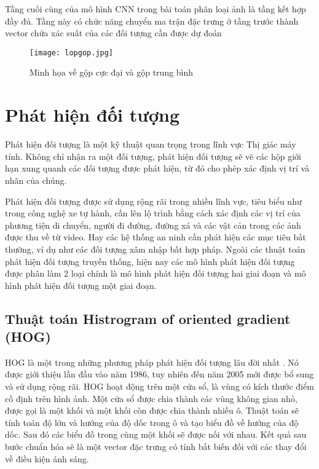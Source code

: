 \documentclass[../the.tex]{subfiles}
\begin{document}
\bigskip

{\fontsize{13}{12} \selectfont

	Tầng cuối cùng của mô hình CNN trong bài toán phân loại ảnh là tầng kết hợp đầy đủ. Tầng này có chức năng chuyển ma trận đặc trưng ở tầng trước thành vector chứa xác suất của các đối tượng cần được dự đoán

}
\begin{figure}[H]
	\centering
	\texttt{[image: lopgop.jpg]}
	\caption{Minh họa về gộp cực đại và gộp trung bình}
	\label{fig:polling}
\end{figure}
\section{Phát hiện đối tượng}
 {\fontsize{13}{12} \selectfont

  Phát hiện đối tượng là một kỹ thuật quan trọng trong lĩnh vực Thị giác máy tính. Không chỉ nhận ra một đối tượng,
  phát hiện đối tượng sẽ vẽ các hộp giới hạn xung quanh các đối tượng được phát hiện, từ đó
  cho phép xác định vị trí và nhãn của chúng.

 }

\bigskip

{\fontsize{13}{12} \selectfont

	Phát hiện đối tượng được sử dụng rộng rãi trong nhiều lĩnh vực, tiêu biểu như trong công nghệ xe tự hành,
	cần lên lộ trình bằng cách xác định các vị trí của phương tiện di chuyển, người đi đường, đường xá và các vật cản trong các ảnh được thu về từ video. Hay các hệ thống an ninh cần phát hiện các mục tiêu bất thường, ví dụ như các đối tượng xâm nhập bất hợp pháp.
	Ngoài các thuật toán phát hiện đối tượng truyền thống, hiện nay các mô hình phát hiện đối tượng được phân làm 2 loại chính là mô hình phát hiện đối tượng hai giai đoạn và mô hình phát hiện đối tượng một giai đoạn.

}
\subsection{Thuật toán Histrogram of oriented gradient (HOG)}
{\fontsize{13}{12} \selectfont

	HOG là một trong những phương pháp phát hiện đối tượng lâu đời nhất \cite{dalal2005histograms}. Nó được giới thiệu lần đầu vào năm 1986,
	tuy nhiên đến năm 2005 mới được bổ sung và sử dụng rộng rãi. HOG hoạt động trên một cửa sổ, là vùng có kích thước điểm cố định trên hình ảnh. Một cửa sổ được chia thành các vùng không gian nhỏ, được gọi là một khối và một khối còn được chia thành nhiều ô.
	Thuật toán sẽ tính toán độ lớn và hướng của độ dốc trong ô và tạo biểu đồ về hướng của độ dốc. Sau đó các biểu đồ trong cùng một khối sẽ được nối với nhau.
	Kết quả sau bước chuẩn hóa sẽ là một vector đặc trưng có tính bất biến đối với các thay đổi về điều kiện ánh sáng.

}
\end{document}
